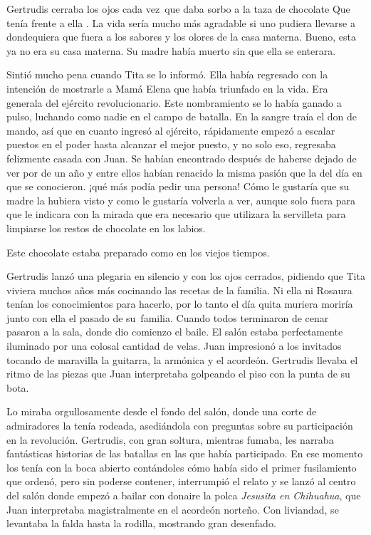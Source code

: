 Gertrudis cerraba los ojos cada vez~que daba sorbo a la taza de
chocolate Que tenía frente a ella . La vida sería mucho más agradable si
uno pudiera llevarse a dondequiera que fuera a los sabores y los olores
de la casa materna. Bueno, esta ya no era su casa materna. Su madre
había muerto sin que ella se enterara.

Sintió mucho pena cuando Tita se lo informó. Ella había regresado con
la intención de mostrarle a Mamá Elena que había triunfado en la vida.
Era generala del ejército revolucionario. Este nombramiento se lo había
ganado a pulso, luchando como nadie en el campo de batalla. En la sangre
traía el don de mando, así que en cuanto ingresó al ejército,
rápidamente empezó a escalar puestos en el poder hasta alcanzar el mejor
puesto, y no solo eso, regresaba felizmente casada con Juan. Se habían
encontrado después de haberse dejado de ver por de un año y entre ellos
habían renacido la misma pasión que la del día en que se conocieron.
¡qué más podía pedir una persona! Cómo le gustaría que su madre la
hubiera visto y como le gustaría volverla a ver, aunque solo fuera para
que le indicara con la mirada que era necesario que utilizara la
servilleta para limpiarse los restos de chocolate en los labios.

Este chocolate estaba preparado como en los viejos tiempos.

Gertrudis lanzó una plegaria en silencio y con los ojos cerrados,
pidiendo que Tita viviera muchos años más cocinando las recetas de la
familia. Ni ella ni Rosaura tenían los conocimientos para hacerlo, por
lo tanto el día quita muriera moriría junto con ella el pasado de su~familia. Cuando todos terminaron de cenar pasaron a la sala, donde
dio comienzo el baile. El salón estaba perfectamente iluminado por una
colosal cantidad de velas. Juan impresionó a los invitados tocando de
maravilla la guitarra, la armónica y el acordeón. Gertrudis llevaba el
ritmo de las piezas que Juan interpretaba golpeando el piso con la punta
de su bota.

Lo miraba orgullosamente desde el fondo del salón, donde una corte de
admiradores la tenía rodeada, asediándola con preguntas sobre su
participación en la revolución. Gertrudis, con gran soltura, mientras
fumaba, les narraba fantásticas historias de las batallas en las que
había participado. En ese momento los tenía con la boca abierto
contándoles cómo había sido el primer fusilamiento que ordenó, pero sin
poderse contener, interrumpió el relato y se lanzó al centro del salón
donde empezó a bailar con donaire la polca \textit{ Jesusita en Chihuahua},
que Juan interpretaba magistralmente en el acordeón norteño. Con
liviandad, se levantaba la falda hasta la rodilla, mostrando gran
desenfado.

